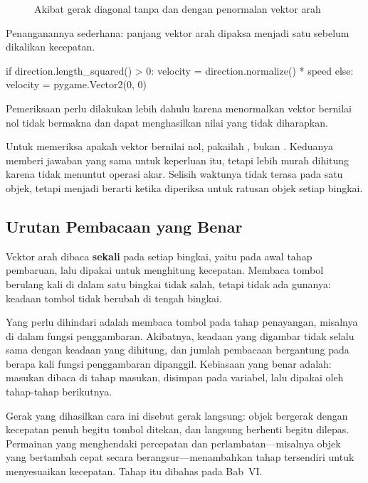 \begin{figure}[htbp]
\centering

\caption{Akibat gerak diagonal tanpa dan dengan penormalan vektor arah}
\label{fig:normalisasi-diagonal}
\end{figure}

Penanganannya sederhana: panjang vektor arah dipaksa menjadi satu sebelum
dikalikan kecepatan.

\begin{kodekeluaran}
if direction.length_squared() > 0:
    velocity = direction.normalize() * speed
else:
    velocity = pygame.Vector2(0, 0)
\end{kodekeluaran}

Pemeriksaan  perlu dilakukan lebih dahulu karena
menormalkan vektor bernilai nol tidak bermakna dan dapat menghasilkan nilai
yang tidak diharapkan.

\begin{tipsbox}
Untuk memeriksa apakah vektor bernilai nol, pakailah
, bukan . Keduanya memberi jawaban yang
sama untuk keperluan itu, tetapi  lebih murah dihitung
karena tidak menuntut operasi akar. Selisih waktunya tidak terasa pada satu objek,
tetapi menjadi berarti ketika diperiksa untuk ratusan objek setiap bingkai.
\end{tipsbox}

\subsection{Urutan Pembacaan yang Benar}

Vektor arah dibaca \textbf{sekali} pada setiap bingkai, yaitu
pada awal tahap pembaruan, lalu dipakai untuk menghitung kecepatan. Membaca
tombol berulang kali di dalam satu bingkai tidak salah, tetapi tidak ada
gunanya: keadaan tombol tidak berubah di tengah bingkai.

Yang perlu dihindari adalah membaca tombol pada tahap penayangan, misalnya di
dalam fungsi penggambaran. Akibatnya, keadaan yang digambar tidak selalu sama
dengan keadaan yang dihitung, dan jumlah pembacaan bergantung pada berapa kali
fungsi penggambaran dipanggil. Kebiasaan yang benar adalah: masukan dibaca di
tahap masukan, disimpan pada variabel, lalu dipakai oleh tahap-tahap
berikutnya.

\begin{catatabox}
Gerak yang dihasilkan cara ini disebut gerak langsung: objek bergerak dengan
kecepatan penuh begitu tombol ditekan, dan langsung berhenti begitu dilepas.
Permainan yang menghendaki percepatan dan perlambatan---misalnya objek yang
bertambah cepat secara berangsur---menambahkan tahap tersendiri untuk
menyesuaikan kecepatan. Tahap itu dibahas pada Bab~VI.
\end{catatabox}
